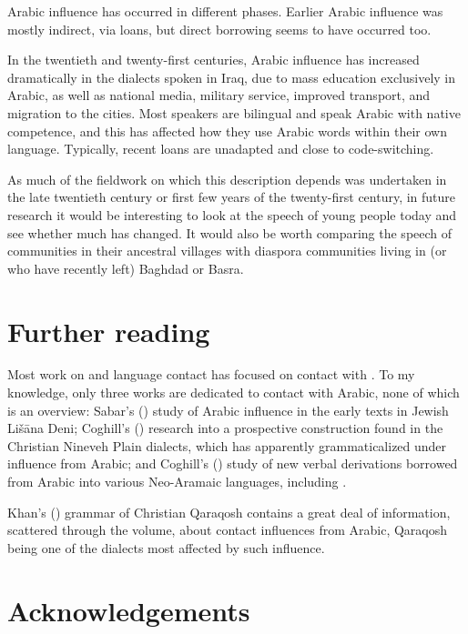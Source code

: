 \documentclass[output=paper]{langsci/langscibook}
\begin{document}
Arabic influence has occurred in different phases. Earlier Arabic influence was mostly indirect, via  loans, but direct borrowing seems to have occurred too.

In the twentieth and twenty-first centuries, Arabic influence has increased dramatically in the dialects spoken in Iraq, due to mass education exclusively in Arabic, as well as national media, military service, improved transport, and migration to the  cities. Most  speakers are bilingual and speak Arabic with native competence, and this has affected how they use Arabic words within their own language. Typically, recent loans are unadapted and close to {code-switching}.

As much of the fieldwork on which this description depends was undertaken in the late twentieth century or first few years of the twenty-first century, in {future} research it would be interesting to look at the speech of young people today and see whether much has changed. It would also be worth comparing the speech of communities in their ancestral villages with {diaspora} communities living in (or who have recently left) Baghdad or Basra.

\section*{Further reading}

Most work on  and language contact has focused on contact with . To my knowledge, only three works are dedicated to contact with Arabic, none of which is an overview: Sabar's (\citeyear{Sabar1984}) study of Arabic influence in the early texts in Jewish Lišāna Deni; Coghill’s (\citeyear{Coghill2010,Coghill2012}) research into a {prospective} construction found in the Christian Nineveh Plain dialects, which has apparently grammaticalized under influence from Arabic; and Coghill's (\citeyear{Coghill2015}) study of new verbal derivations borrowed from Arabic into various Neo-Aramaic languages, including .

Khan's (\citeyear{Khan2002}) grammar of Christian Qaraqosh contains a great deal of information, scattered through the volume, about contact influences from Arabic, Qaraqosh being one of the dialects most affected by such influence.

\section*{Acknowledgements}
\end{document}
